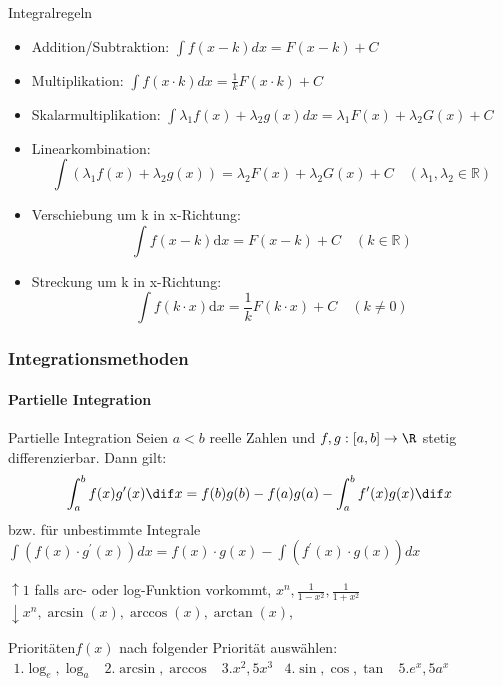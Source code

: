 \begin{concept}{Integralregeln}
    \begin{itemize}
      \item Addition/Subtraktion:
      $\int f(x-k) d x=F(x-k)+C$
      \item Multiplikation:
      $\int f(x \cdot k) d x=\frac{1}{k} F(x \cdot k)+C$
      \item Skalarmultiplikation:
      $\int \lambda_{1} f(x)+\lambda_{2} g(x) d x=\lambda_{1} F(x)+\lambda_{2} G(x)+C$
      \item Linearkombination: \[\int{(\lambda_1f(x)+\lambda_2g(x))} = \lambda_2F(x)+\lambda_2G(x)+C \quad (\lambda_1,\lambda_2 \in \mathbb{R} )\]
      \item Verschiebung um k in x-Richtung: \[\int{f(x-k)\mathrm{d}x}= F(x-k)+C \quad (k \in \mathbb{R}) \]
      \item Streckung um k in x-Richtung: \[\int{f(k\cdot x)\mathrm{d}x}= \frac{1}{k}F(k\cdot x)+C \quad (k\neq0 )\]
    \end{itemize}
\end{concept}



\subsubsection{Integrationsmethoden}
\paragraph{Partielle Integration}

\begin{concept}{Partielle Integration}
	Seien $a < b$ reelle Zahlen und $f,g:[a,b] \to \R$ stetig differenzierbar. Dann gilt:
   \begin{equation*}
	   \int_a^b f(x) g'(x) \dif x = f(b) g(b) - f(a) g(a) - \int_a^b f'(x)g(x) \dif x
   \end{equation*}
   bzw. für unbestimmte Integrale\\

   $
   \int\left(f(x) \cdot g^{\prime}(x)\right) d x=f(x) \cdot g(x)-\int\left(f^{\prime}(x) \cdot g(x)\right) d x
   $
\end{concept}
\begin{remark}
   $\uparrow 1$ falls arc- oder log-Funktion vorkommt, $x^{n}, \frac{1}{1-x^{2}}, \frac{1}{1+x^{2}}$\\

   $\downarrow x^{n}, \arcsin (x), \arccos (x), \arctan (x)$,
\end{remark}
\begin{KR}{Prioritäten}$f(x)$ nach folgender Priorität auswählen:\\
   $
   \begin{array}{lllll}
	   1. \log_e, \log_a  & 2. \arcsin, \arccos &  3. x^2, 5x^3 & 4. \sin, \cos, \tan & 5. e^x, 5a^x
   \end{array}
   $
\end{KR}

